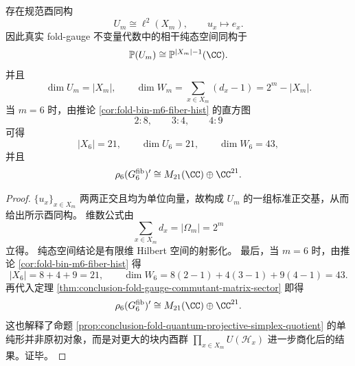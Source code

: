 \begin{corollary}[真实规范纯态空间复现为射影空间]\label{cor:conclusion-fold-gauge-purestate-projective-space}
存在规范酉同构
\[
U_m\cong \ell^2(X_m),
\qquad
u_x\longmapsto e_x.
\]
因此真实 fold-gauge 不变量代数中的相干纯态空间同构于
\[
\mathbb P(U_m)\cong \mathbb P^{|X_m|-1}(\CC).
\]
并且
\[
\dim U_m=|X_m|,
\qquad
\dim W_m=\sum_{x\in X_m}(d_x-1)=2^m-|X_m|.
\]
当 \(m=6\) 时，由推论 \ref{cor:fold-bin-m6-fiber-hist} 的直方图
\[
2{:}8,\qquad 3{:}4,\qquad 4{:}9
\]
可得
\[
|X_6|=21,\qquad \dim U_6=21,\qquad \dim W_6=43,
\]
并且
\[
\rho_6(G_6^{\mathrm{fib}})'
\cong
M_{21}(\CC)\oplus \CC^{21}.
\]
\end{corollary}
\begin{proof}
\(\{u_x\}_{x\in X_m}\) 两两正交且均为单位向量，故构成 \(U_m\) 的一组标准正交基，从而给出所示酉同构。
维数公式由
\[
\sum_{x\in X_m}d_x=|\Omega_m|=2^m
\]
立得。
纯态空间结论是有限维 Hilbert 空间的射影化。
最后，当 \(m=6\) 时，由推论 \ref{cor:fold-bin-m6-fiber-hist} 得
\[
|X_6|=8+4+9=21,
\qquad
\dim W_6=8(2-1)+4(3-1)+9(4-1)=43.
\]
再代入定理 \ref{thm:conclusion-fold-gauge-commutant-matrix-sector} 即得
\[
\rho_6(G_6^{\mathrm{fib}})'\cong M_{21}(\CC)\oplus \CC^{21}.
\]
这也解释了命题 \ref{prop:conclusion-fold-quantum-projective-simplex-quotient} 的单纯形并非原初对象，而是对更大的块内酉群 \(\prod_{x\in X_m}U(\mathcal H_x)\) 进一步商化后的结果。证毕。
\end{proof}

